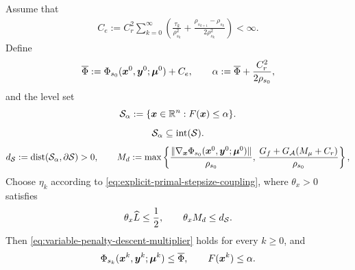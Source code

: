 \begin{lemma}
\label{lem:bounded-iterates}
  Assume that
\begin{equation}
\begin{aligned}
    C_e
    :=C_r^2\sum_{k=0}^{\infty}
    \left(
        \frac{\tau_k}{\rho_{s_k}^2}
        +\frac{\rho_{s_{k+1}}-\rho_{s_k}}{2\rho_{s_k}^2}
    \right)
    <\infty.
\end{aligned}
\label{eq:total-potential-error}
\end{equation}
Define
\begin{equation}
    \overline\Phi
    :=\Phi_{s_0}(\bm{x}^0,\bm{y}^0;\bm{\mu}^0)+C_e,
    \qquad
    \alpha
    :=\overline\Phi+\frac{C_r^2}{2\rho_{s_0}},
    \label{eq:localized-level-value}
\end{equation}
and the level set
\begin{equation}
    \mathcal{S}_\alpha:=\{\bm{x}\in\mathbb{R}^n:F(\bm{x})\le\alpha\}.
    \label{eq:derived-x-working-set}
\end{equation}
\begin{equation}
    \mathcal{S}_\alpha\subseteq\operatorname{int}(\mathcal{S}).
    \label{eq:level-set-interior-containment}
\end{equation}
\begin{equation}
    d_{\mathcal{S}}:=\operatorname{dist}(\mathcal{S}_\alpha,\partial\mathcal{S})>0,
    \qquad
    M_d:=\max\left\{
        \frac{\|\nabla_{\bm{x}}\Phi_{s_0}(\bm{x}^0,\bm{y}^0;\bm{\mu}^0)\|}{\rho_{s_0}},\,
        \frac{G_f+G_{\mathcal{A}}(M_\mu+C_r)}{\rho_{s_0}}
    \right\},
    \label{eq:level-set-boundary-distance}
\end{equation}
Choose $\eta_k$ according to
\eqref{eq:explicit-primal-stepsize-coupling}, where $\theta_x>0$ satisfies
\begin{equation}
    \theta_x\widehat L\le\frac12,
    \qquad
    \theta_x M_d\le d_{\mathcal{S}}.
    \label{eq:localized-primal-stepsize}
\end{equation}
Then \eqref{eq:variable-penalty-descent-multiplier} holds for every $k\ge0$,
and
\begin{equation}
    \Phi_{s_k}(\bx^k,\by^k;\bmu^k)\le\overline\Phi,
    \qquad
    F(\bx^k)\le\alpha.

\end{equation}
\end{lemma}

